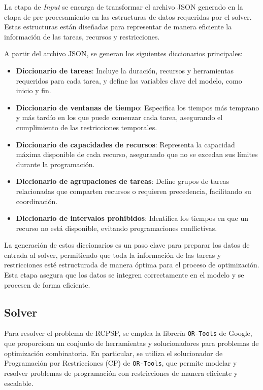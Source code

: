 \documentclass{article}
\begin{document}
La etapa de \textit{Input} se encarga de transformar el archivo JSON generado en la etapa de pre-procesamiento en las estructuras de datos requeridas por el solver. Estas estructuras están diseñadas para representar de manera eficiente la información de las tareas, recursos y restricciones.

A partir del archivo JSON, se generan los siguientes diccionarios principales:

\begin{itemize}
    \item \textbf{Diccionario de tareas}: Incluye la duración, recursos y herramientas requeridos para cada tarea, y define las variables clave del modelo, como inicio y fin.  

    \item \textbf{Diccionario de ventanas de tiempo}: Especifica los tiempos más temprano y más tardío en los que puede comenzar cada tarea, asegurando el cumplimiento de las restricciones temporales.  

    \item \textbf{Diccionario de capacidades de recursos}: Representa la capacidad máxima disponible de cada recurso, asegurando que no se excedan sus límites durante la programación.  

    \item \textbf{Diccionario de agrupaciones de tareas}: Define grupos de tareas relacionadas que comparten recursos o requieren precedencia, facilitando su coordinación.  

    \item \textbf{Diccionario de intervalos prohibidos}: Identifica los tiempos en que un recurso no está disponible, evitando programaciones conflictivas.  
\end{itemize}

La generación de estos diccionarios es un paso clave para preparar los datos de entrada al solver, permitiendo que toda la información de las tareas y restricciones esté estructurada de manera óptima para el proceso de optimización. Esta etapa asegura que los datos se integren correctamente en el modelo y se procesen de forma eficiente.


\subsection{Solver}

Para resolver el problema de RCPSP, se emplea la librería \texttt{OR-Tools} de Google, que proporciona un conjunto de herramientas y solucionadores para problemas de optimización combinatoria. En particular, se utiliza el solucionador de Programación por Restricciones (CP) de \texttt{OR-Tools}, que permite modelar y resolver problemas de programación con restricciones de manera eficiente y escalable.
\end{document}
